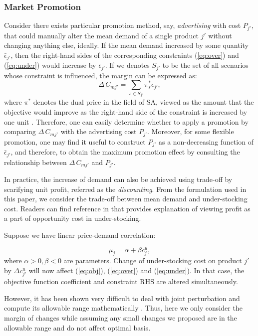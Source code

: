 \documentclass[a4paper,11pt]{article}
\begin{document}
\subsubsection{Market Promotion}
\label{ss:promotion}
Consider there exists particular promotion method, say, \emph{advertising} with cost $P_{j'}$, that could manually alter the mean demand of a single product $j'$ without changing anything else, ideally. If the mean demand increased by some quantity $\bar{\epsilon}_{j'}$, then the right-hand sides of the corresponding constraints (\ref{eq:over}) and (\ref{eq:under}) would increase by $\bar{\epsilon}_{j'}$. If we denotes $S_{j'}$ to be the set of all scenarios whose constraint is influenced, the margin can be expressed as:
\[
    \Delta \, C_{mj'} = \sum_{s \in S_{j'}} \pi_s^* \bar{\epsilon}_{j'},
\]
where $\pi^*$ denotes the dual price in the field of SA, viewed as the amount that the objective would improve as the right-hand side of the constraint is increased by one unit \cite{D98}. Therefore, one can easily determine whether to apply a promotion by comparing $\Delta \, C_{mj'}$ with the advertising cost $P_{j'}$. Moreover, for some flexible promotion, one may find it useful to construct $P_{j'}$ as a non-decreasing function of $\bar{\epsilon}_{j'}$, and therefore, to obtain the maximum promotion effect by consulting the relationship between $\Delta \, C_{mj'}$ and $P_{j'}$.

In practice, the increase of demand can also be achieved using trade-off by scarifying unit profit, referred as the \emph{discounting}. From the formulation used in this paper, we consider the trade-off between mean demand and under-stocking cost. Readers can find reference in \cite{Ch12,Po02,SPP98} that provides explanation of viewing profit as a part of opportunity cost in under-stocking.

Suppose we have linear price-demand correlation:

\[
    \mu_j = \alpha + \beta c_j^u,
\]
where $\alpha > 0, \beta < 0$ are parameters. Change of under-stocking cost on product $j'$ by $\Delta c_{j'}^u$ will now affect (\ref{eq:obj}), (\ref{eq:over}) and (\ref{eq:under}). In that case, the objective function coefficient and constraint RHS are altered simultaneously.

However, it has been shown very difficult to deal with joint perturbation and compute its allowable range mathematically \cite{SHH14}. Thus, here we only consider the margin of changes while assuming any small changes we proposed are in the allowable range and do not affect optimal basis. 
\end{document}
